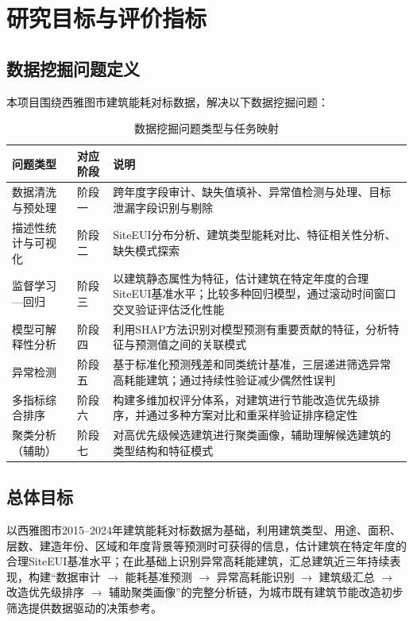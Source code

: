 \section{研究目标与评价指标}

\subsection{数据挖掘问题定义}

本项目围绕西雅图市建筑能耗对标数据，解决以下数据挖掘问题：

\begin{table}[H]
\centering
\caption{数据挖掘问题类型与任务映射}
\label{tab:dm_problems}
\begin{tabular}{p{2.5cm}p{3cm}p{6.5cm}}
\hline
\textbf{问题类型} & \textbf{对应阶段} & \textbf{说明} \\
\hline
数据清洗与预处理 & 阶段一 & 跨年度字段审计、缺失值填补、异常值检测与处理、目标泄漏字段识别与剔除 \\
\hline
描述性统计与可视化 & 阶段二 & SiteEUI分布分析、建筑类型能耗对比、特征相关性分析、缺失模式探索 \\
\hline
监督学习—回归 & 阶段三 & 以建筑静态属性为特征，估计建筑在特定年度的合理SiteEUI基准水平；比较多种回归模型，通过滚动时间窗口交叉验证评估泛化性能 \\
\hline
模型可解释性分析 & 阶段四 & 利用SHAP方法识别对模型预测有重要贡献的特征，分析特征与预测值之间的关联模式 \\
\hline
异常检测 & 阶段五 & 基于标准化预测残差和同类统计基准，三层递进筛选异常高耗能建筑；通过持续性验证减少偶然性误判 \\
\hline
多指标综合排序 & 阶段六 & 构建多维加权评分体系，对建筑进行节能改造优先级排序，并通过多种方案对比和重采样验证排序稳定性 \\
\hline
聚类分析（辅助） & 阶段七 & 对高优先级候选建筑进行聚类画像，辅助理解候选建筑的类型结构和特征模式 \\
\hline
\end{tabular}
\end{table}

\subsection{总体目标}

以西雅图市2015--2024年建筑能耗对标数据为基础，利用建筑类型、用途、面积、层数、建造年份、区域和年度背景等预测时可获得的信息，估计建筑在特定年度的合理SiteEUI基准水平；在此基础上识别异常高耗能建筑，汇总建筑近三年持续表现，构建``数据审计 $\rightarrow$ 能耗基准预测 $\rightarrow$ 异常高耗能识别 $\rightarrow$ 建筑级汇总 $\rightarrow$ 改造优先级排序 $\rightarrow$ 辅助聚类画像''的完整分析链，为城市既有建筑节能改造初步筛选提供数据驱动的决策参考。

